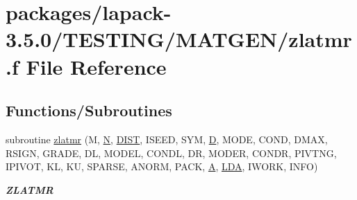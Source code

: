 \hypertarget{zlatmr_8f}{}\section{packages/lapack-\/3.5.0/\+T\+E\+S\+T\+I\+N\+G/\+M\+A\+T\+G\+E\+N/zlatmr.f File Reference}
\label{zlatmr_8f}
\subsection*{Functions/\+Subroutines}
\begin{DoxyCompactItemize}
\item 
subroutine \hyperlink{group__complex16__matgen_gaa5a10e6e0222dec668950eb66ab46465}{zlatmr} (M, \hyperlink{polmisc_8c_a0240ac851181b84ac374872dc5434ee4}{N}, \hyperlink{superlu__enum__consts_8h_af00a42ecad444bbda75cde1b64bd7e72ac04fbbdf0d80a4ad25e565541deeebd7}{D\+I\+S\+T}, I\+S\+E\+E\+D, S\+Y\+M, \hyperlink{odrpack_8h_a7dae6ea403d00f3687f24a874e67d139}{D}, M\+O\+D\+E, C\+O\+N\+D, D\+M\+A\+X, R\+S\+I\+G\+N, G\+R\+A\+D\+E, D\+L, M\+O\+D\+E\+L, C\+O\+N\+D\+L, D\+R, M\+O\+D\+E\+R, C\+O\+N\+D\+R, P\+I\+V\+T\+N\+G, I\+P\+I\+V\+O\+T, K\+L, K\+U, S\+P\+A\+R\+S\+E, A\+N\+O\+R\+M, P\+A\+C\+K, \hyperlink{classA}{A}, \hyperlink{example__user_8c_ae946da542ce0db94dced19b2ecefd1aa}{L\+D\+A}, I\+W\+O\+R\+K, I\+N\+F\+O)
\begin{DoxyCompactList}\small\item\em {\bfseries Z\+L\+A\+T\+M\+R} \end{DoxyCompactList}\end{DoxyCompactItemize}
